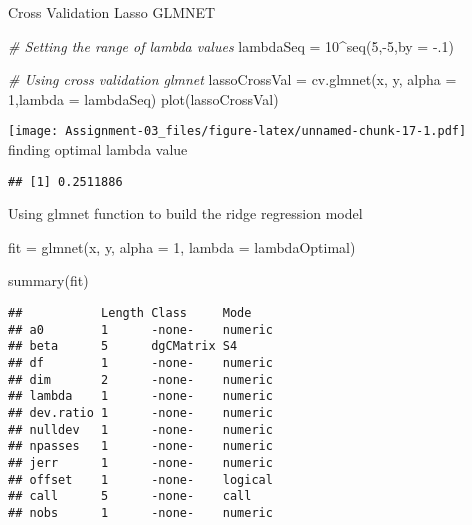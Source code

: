 \documentclass[
]{article}
\newenvironment{Shaded}{\begin{snugshade}}{\end{snugshade}}
\newcommand{\AttributeTok}[1]{\textcolor[rgb]{0.77,0.63,0.00}{#1}}
\newcommand{\CommentTok}[1]{\textcolor[rgb]{0.56,0.35,0.01}{\textit{#1}}}
\newcommand{\DecValTok}[1]{\textcolor[rgb]{0.00,0.00,0.81}{#1}}
\newcommand{\FunctionTok}[1]{\textcolor[rgb]{0.00,0.00,0.00}{#1}}
\newcommand{\NormalTok}[1]{#1}
\newcommand{\OtherTok}[1]{\textcolor[rgb]{0.56,0.35,0.01}{#1}}
\newcommand{\SpecialCharTok}[1]{\textcolor[rgb]{0.00,0.00,0.00}{#1}}
\begin{document}
Cross Validation Lasso GLMNET

\begin{Shaded}
\begin{Highlighting}[]
\CommentTok{\# Setting the range of lambda values}
\NormalTok{lambdaSeq }\OtherTok{=} \DecValTok{10}\SpecialCharTok{\^{}}\FunctionTok{seq}\NormalTok{(}\DecValTok{5}\NormalTok{,}\SpecialCharTok{{-}}\DecValTok{5}\NormalTok{,}\AttributeTok{by =} \SpecialCharTok{{-}}\NormalTok{.}\DecValTok{1}\NormalTok{)}

\CommentTok{\# Using cross validation glmnet}
\NormalTok{lassoCrossVal }\OtherTok{=} \FunctionTok{cv.glmnet}\NormalTok{(x, y, }\AttributeTok{alpha =} \DecValTok{1}\NormalTok{,}\AttributeTok{lambda =}\NormalTok{ lambdaSeq)}
\FunctionTok{plot}\NormalTok{(lassoCrossVal)}
\end{Highlighting}
\end{Shaded}

\texttt{[image: Assignment-03\_files/figure-latex/unnamed-chunk-17-1.pdf]}
finding optimal lambda value

\begin{Shaded}
\end{Shaded}

\begin{verbatim}
## [1] 0.2511886
\end{verbatim}

Using glmnet function to build the ridge regression model

\begin{Shaded}
\begin{Highlighting}[]
\NormalTok{fit }\OtherTok{=} \FunctionTok{glmnet}\NormalTok{(x, y, }\AttributeTok{alpha =} \DecValTok{1}\NormalTok{, }\AttributeTok{lambda  =}\NormalTok{ lambdaOptimal)}

\FunctionTok{summary}\NormalTok{(fit)}
\end{Highlighting}
\end{Shaded}

\begin{verbatim}
##           Length Class     Mode   
## a0        1      -none-    numeric
## beta      5      dgCMatrix S4     
## df        1      -none-    numeric
## dim       2      -none-    numeric
## lambda    1      -none-    numeric
## dev.ratio 1      -none-    numeric
## nulldev   1      -none-    numeric
## npasses   1      -none-    numeric
## jerr      1      -none-    numeric
## offset    1      -none-    logical
## call      5      -none-    call   
## nobs      1      -none-    numeric
\end{verbatim}
\end{document}
